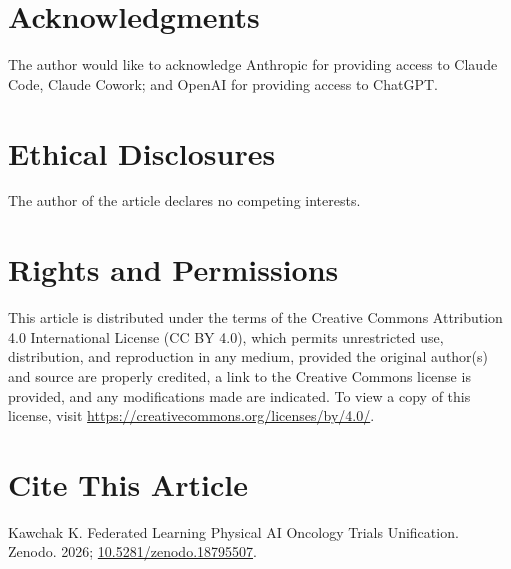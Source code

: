 \documentclass[10pt]{article}
\begin{document}



\section*{Acknowledgments}

The author would like to acknowledge Anthropic for providing access to Claude Code, Claude Cowork; and OpenAI for providing access to ChatGPT.

\section*{Ethical Disclosures}

The author of the article declares no competing interests.

\section*{Rights and Permissions}

This article is distributed under the terms of the Creative Commons Attribution 4.0 International License (CC BY 4.0), which permits unrestricted use, distribution, and reproduction in any medium, provided the original author(s) and source are properly credited, a link to the Creative Commons license is provided, and any modifications made are indicated. To view a copy of this license, visit \url{https://creativecommons.org/licenses/by/4.0/}.

\section*{Cite This Article}

Kawchak K. Federated Learning Physical AI Oncology Trials Unification. Zenodo. 2026; \href{https://doi.org/10.5281/zenodo.18795507}{10.5281/zenodo.18795507}.
\end{document}
